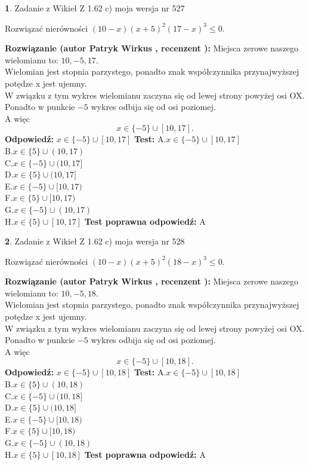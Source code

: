 \documentclass[12pt, a4paper]{article}
\theoremstyle{definition} %
\newtheorem{zad}{}
\newcommand{\zadStart}[1]{\begin{zad}#1\newline}
\newcommand{\zadStop}{\end{zad}}
\newcommand{\rozwStart}[2]{\noindent \textbf{Rozwiązanie (autor #1 , recenzent #2): }\newline}
\newcommand{\rozwStop}{\newline}
\newcommand{\odpStart}{\noindent \textbf{Odpowiedź:}\newline}
\newcommand{\odpStop}{\newline}
\newcommand{\testStart}{\noindent \textbf{Test:}\newline}
\newcommand{\testStop}{\newline}
\newcommand{\kluczStart}{\noindent \textbf{Test poprawna odpowiedź:}\newline}
\newcommand{\kluczStop}{\newline}
\begin{document}
\zadStart{Zadanie z Wikieł Z 1.62 c) moja wersja nr 527}

Rozwiązać nierówności $(10-x)(x+5)^{2}(17-x)^{3}\le0$.
\zadStop
\rozwStart{Patryk Wirkus}{}
Miejsca zerowe naszego wielomianu to: $10, -5, 17$.\\
Wielomian jest stopnia parzystego, ponadto znak współczynnika przy\linebreak najwyższej potędze x jest ujemny.\\ W związku z tym wykres wielomianu zaczyna się od lewej strony powyżej osi OX.\\
Ponadto w punkcie $-5$ wykres odbija się od osi poziomej.\\
A więc $$x \in \{-5\} \cup [10,17].$$
\rozwStop
\odpStart
$x \in \{-5\} \cup [10,17]$
\odpStop
\testStart
A.$x \in \{-5\} \cup [10,17]$\\
B.$x \in \{5\} \cup (10,17)$\\
C.$x \in \{-5\} \cup (10,17]$\\
D.$x \in \{5\} \cup (10,17]$\\
E.$x \in \{-5\} \cup [10,17)$\\
F.$x \in \{5\} \cup [10,17)$\\
G.$x \in \{-5\} \cup (10,17)$\\
H.$x \in \{5\} \cup [10,17]$
\testStop
\kluczStart
A
\kluczStop



\zadStart{Zadanie z Wikieł Z 1.62 c) moja wersja nr 528}

Rozwiązać nierówności $(10-x)(x+5)^{2}(18-x)^{3}\le0$.
\zadStop
\rozwStart{Patryk Wirkus}{}
Miejsca zerowe naszego wielomianu to: $10, -5, 18$.\\
Wielomian jest stopnia parzystego, ponadto znak współczynnika przy\linebreak najwyższej potędze x jest ujemny.\\ W związku z tym wykres wielomianu zaczyna się od lewej strony powyżej osi OX.\\
Ponadto w punkcie $-5$ wykres odbija się od osi poziomej.\\
A więc $$x \in \{-5\} \cup [10,18].$$
\rozwStop
\odpStart
$x \in \{-5\} \cup [10,18]$
\odpStop
\testStart
A.$x \in \{-5\} \cup [10,18]$\\
B.$x \in \{5\} \cup (10,18)$\\
C.$x \in \{-5\} \cup (10,18]$\\
D.$x \in \{5\} \cup (10,18]$\\
E.$x \in \{-5\} \cup [10,18)$\\
F.$x \in \{5\} \cup [10,18)$\\
G.$x \in \{-5\} \cup (10,18)$\\
H.$x \in \{5\} \cup [10,18]$
\testStop
\kluczStart
A
\kluczStop
\end{document}
